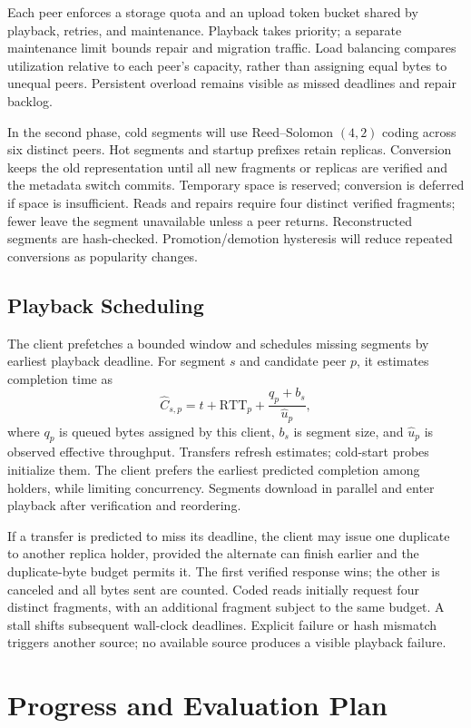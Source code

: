 \documentclass[letterpaper,twocolumn,10pt]{article}
\begin{document}
Each peer enforces a storage quota and an upload token bucket shared by playback, retries, and maintenance. Playback takes priority; a separate maintenance limit bounds repair and migration traffic. Load balancing compares utilization relative to each peer's capacity, rather than assigning equal bytes to unequal peers. Persistent overload remains visible as missed deadlines and repair backlog.

In the second phase, cold segments will use Reed--Solomon $(4,2)$ coding across six distinct peers. Hot segments and startup prefixes retain replicas. Conversion keeps the old representation until all new fragments or replicas are verified and the metadata switch commits. Temporary space is reserved; conversion is deferred if space is insufficient. Reads and repairs require four distinct verified fragments; fewer leave the segment unavailable unless a peer returns. Reconstructed segments are hash-checked. Promotion/demotion hysteresis will reduce repeated conversions as popularity changes.

\subsection{Playback Scheduling}
The client prefetches a bounded window and schedules missing segments by earliest playback deadline. For segment $s$ and candidate peer $p$, it estimates completion time as
\[
\widehat{C}_{s,p}=t+\widehat{\mathrm{RTT}}_p+
\frac{q_p+b_s}{\widehat{u}_p},
\]
where $q_p$ is queued bytes assigned by this client, $b_s$ is segment size, and $\widehat{u}_p$ is observed effective throughput. Transfers refresh estimates; cold-start probes initialize them. The client prefers the earliest predicted completion among holders, while limiting concurrency. Segments download in parallel and enter playback after verification and reordering.

If a transfer is predicted to miss its deadline, the client may issue one duplicate to another replica holder, provided the alternate can finish earlier and the duplicate-byte budget permits it. The first verified response wins; the other is canceled and all bytes sent are counted. Coded reads initially request four distinct fragments, with an additional fragment subject to the same budget. A stall shifts subsequent wall-clock deadlines. Explicit failure or hash mismatch triggers another source; no available source produces a visible playback failure.

\section{Progress and Evaluation Plan}
\end{document}
